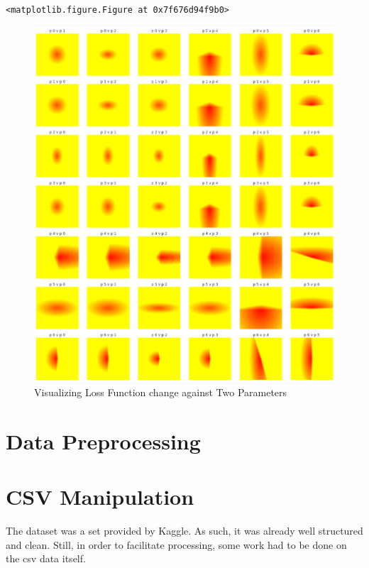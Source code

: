 \documentclass[]{report}
\begin{document}
\begin{verbatim}
<matplotlib.figure.Figure at 0x7f676d94f9b0>
\end{verbatim}

\begin{figure}[htbp]
\centering
\includegraphics{assets/img/loss_function_two_params.png}
\caption{Visualizing Loss Function change against Two Parameters}
\end{figure}

\chapter{Data Preprocessing}

\chapter{CSV Manipulation}\label{csv-manipulation}

The dataset was a set provided by Kaggle. As such, it was already well
structured and clean. Still, in order to facilitate processing, some
work had to be done on the csv data itself.
\end{document}
